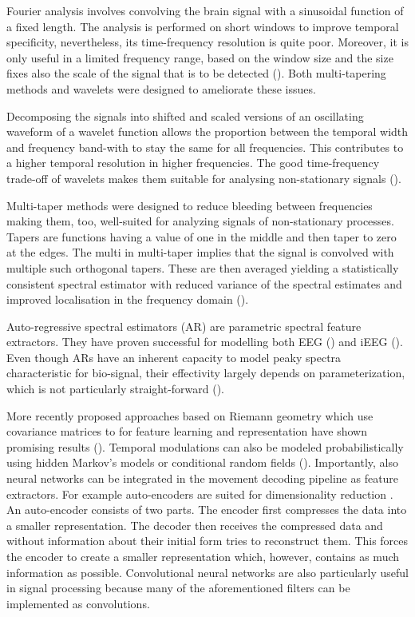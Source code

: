 Fourier analysis involves convolving the brain signal with a sinusoidal function of a fixed length. The analysis is performed on short windows to improve temporal specificity, nevertheless, its time-frequency resolution is quite poor.
Moreover, it is only useful in a limited frequency range, based on the window size and the size fixes also the scale of the signal that is to be detected (\cite{36-vugt-2007}). 
Both multi-tapering methods and wavelets were designed to ameliorate these issues. 

Decomposing the signals into shifted and scaled versions of an oscillating waveform of a wavelet function allows the proportion between the temporal width and frequency band-with to stay the same for all frequencies. 
This contributes to a higher temporal resolution in higher frequencies. The good time-frequency trade-off of wavelets makes them suitable for analysing non-stationary signals (\cite{36-vugt-2007}).  

Multi-taper methods were designed to reduce bleeding between frequencies making them, too, well-suited for analyzing signals of non-stationary processes. 
Tapers are functions having a value of one in the middle and then taper to zero at the edges. 
The multi in multi-taper implies that the signal is convolved with multiple such orthogonal tapers.
These are then averaged yielding a statistically consistent spectral estimator with reduced variance of the spectral estimates and improved localisation in the frequency domain (\cite{multitaper-31}).

Auto-regressive spectral estimators (AR) are parametric spectral feature extractors.
They have proven successful for modelling both EEG (\cite{auto-regressive-eeg}) and iEEG (\cite{anderson-offline-2009}).
Even though ARs have an inherent capacity to model peaky spectra characteristic for bio-signal, their effectivity largely depends on parameterization, which is not particularly straight-forward (\cite{anderson-offline-2009}). 

More recently proposed approaches based on Riemann geometry which use covariance matrices to for feature learning and representation have shown promising results (\cite{coherence-based}).
Temporal modulations can also be modeled probabilistically using hidden Markov's models or conditional random fields (\cite{markov-models-decoding, bayesian-decoding}).
Importantly, also neural networks can be integrated in the movement decoding pipeline as feature extractors.
For example auto-encoders are suited for dimensionality reduction \cite{autoencoder}.
An auto-encoder consists of two parts.
The encoder first compresses the data into a smaller representation.
The decoder then receives the compressed data and without information about their initial form tries to reconstruct them.
This forces the encoder to create a smaller representation which, however, contains as much information as possible.
Convolutional neural networks are also particularly useful in signal processing because many of the aforementioned filters can be implemented as convolutions. 



